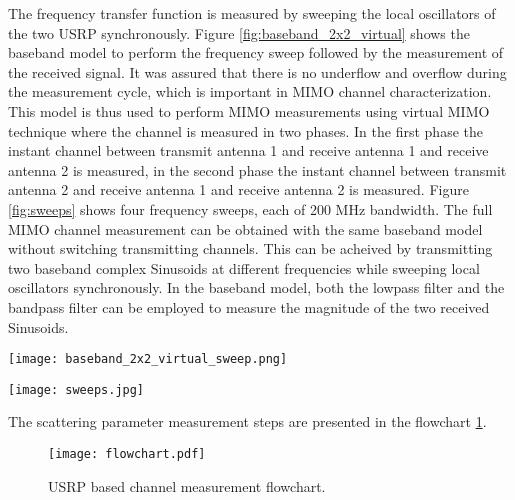 \documentclass[10pt, final, journal, letterpaper, oneside, twocolumn]{IEEEtran}
\begin{document}
The frequency transfer function is measured by sweeping the local oscillators of the two USRP synchronously. Figure \ref{fig:baseband_2x2_virtual} shows the baseband model to perform the frequency sweep followed by the measurement of the received signal. It was assured that there is no underflow and overflow during the measurement cycle, which is important in MIMO channel characterization. This model is thus used to perform MIMO measurements using virtual MIMO technique where the channel is measured in two phases. In the first phase the instant channel between transmit antenna 1 and receive antenna 1 and receive antenna 2 is measured, in the second phase the instant channel between transmit antenna 2 and receive antenna 1 and receive antenna 2 is measured. 
Figure \ref{fig:sweeps} shows four frequency sweeps, each of 200 MHz bandwidth. The full MIMO channel measurement can be obtained with the same baseband model without switching transmitting channels. This can be acheived by transmitting two baseband complex Sinusoids at different frequencies while sweeping local oscillators synchronously. In the baseband model, both the lowpass filter and the bandpass filter can be employed to measure the magnitude of the two received Sinusoids.
\begin{figure*}
    \centering
    \texttt{[image: baseband\_2x2\_virtual\_sweep.png]}
    \caption{Simulink model for the MIMO frequency transfer function measurement.}
    \label{fig:baseband_2x2_virtual}
\end{figure*}
\begin{figure*}
    \centering
    \texttt{[image: sweeps.jpg]}
    \caption{Number of frequency sweeps.}
    \label{fig:sweeps}
\end{figure*}
The scattering parameter measurement steps are presented in the flowchart \ref{fig:tf_flowchart}.
    \begin{figure}
        \centering
        \texttt{[image: flowchart.pdf]}
        \caption{USRP based channel measurement flowchart.}
        \label{fig:tf_flowchart}
    \end{figure}
\vspace{-0.35cm}
\end{document}
